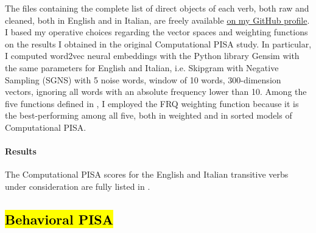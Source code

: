 The files containing the complete list of direct objects of each verb, both raw and cleaned, both in English and in Italian, are freely available \href{https://github.com/giuliacappelli/dissertationData}{on my GitHub profile}.\\
I based my operative choices regarding the vector spaces and weighting functions on the results I obtained in the original Computational PISA study. In particular, I computed word2vec neural embeddings with the Python library Gensim with the same parameters for English and Italian, i.e. Skipgram with Negative Sampling (SGNS) with 5 noise words, window of 10 words, 300-dimension vectors, ignoring all words with an absolute frequency lower than 10. Among the five functions defined in \textcite{CappelliLenciPISA}, I employed the FRQ weighting function because it is the best-performing among all five, both in weighted and in sorted models of Computational PISA.

\paragraph{Results}
The Computational PISA scores for the English and Italian transitive verbs under consideration are fully listed in .\\ %


\subsection{\hl{Behavioral PISA}}

